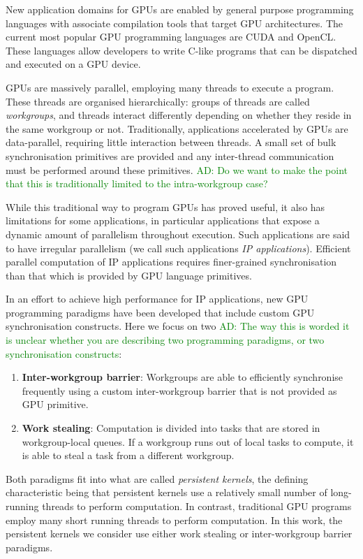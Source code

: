\documentclass[nocopyrightspace]{sigplanconf-pldi16}
\newcommand{\ADComment}[1]{\textcolor{green}{AD: #1}}
\begin{document}
New application domains for GPUs are enabled by general purpose
programming languages with associate compilation tools that target GPU architectures.
The current most popular GPU programming languages are CUDA and OpenCL. These languages allow developers to
write C-like programs that can be dispatched and executed on a GPU
device.

GPUs are massively parallel, employing many threads to execute a
program.  These threads are organised hierarchically: groups of threads
are called \emph{workgroups}, and threads interact differently depending on whether they reside in the same workgroup or not.  Traditionally, applications accelerated by GPUs are
data-parallel, requiring little interaction between threads. A small
set of bulk synchronisation primitives are provided and any
inter-thread communication must be performed around these primitives.  \ADComment{Do we want to make the point that this is traditionally limited to the intra-workgroup case?}

While this traditional way to program GPUs has proved useful, it also
has limitations for some applications, in particular applications that
expose a dynamic amount of parallelism throughout execution. Such
applications are said to have irregular parallelism (we call such
applications \emph{IP applications}). Efficient parallel computation
of IP applications requires finer-grained synchronisation than that
which is provided by GPU language primitives.

In an effort to achieve high performance for IP applications, new GPU
programming paradigms have been developed that include custom GPU
synchronisation constructs. Here we focus on two \ADComment{The way this is worded it is unclear whether you are describing two programming paradigms, or two synchronisation constructs}:

\begin{enumerate}
\item {\bf Inter-workgroup barrier}: Workgroups are able to
  efficiently synchronise frequently using a custom inter-workgroup
  barrier that is not provided as GPU primitive.

\item {\bf Work stealing}: Computation is divided into tasks that are
  stored in workgroup-local queues. If a workgroup runs out of local
  tasks to compute, it is able to steal a task from a different
  workgroup.
\end{enumerate}

Both paradigms fit into what are called \emph{persistent kernels}, the
defining characteristic being that persistent kernels use a relatively
small number of long-running threads to perform computation. In
contrast, traditional GPU programs employ many short running threads
to perform computation. In this work, the persistent kernels we consider
use either work stealing or inter-workgroup barrier paradigms.
\end{document}

